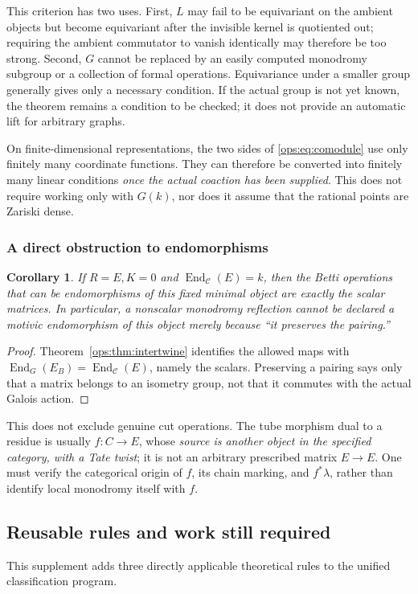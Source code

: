 \documentclass[11pt,a4paper,oneside]{article}
\theoremstyle{plain}
\newtheorem{corollary}[theorem]{Corollary}
\theoremstyle{definition}
\theoremstyle{remark}
\newcommand{\End}{\operatorname{End}}
\numberwithin{equation}{section}
\begin{document}
This criterion has two uses. First, $L$ may fail to be equivariant on the ambient objects but become equivariant after the invisible kernel is quotiented out;
requiring the ambient commutator to vanish identically may therefore be too strong. Second, $G$ cannot be replaced by an easily computed
monodromy subgroup or a collection of formal operations. Equivariance under a smaller group generally gives only a necessary condition.
If the actual group is not yet known, the theorem remains a condition to be checked; it does not provide an automatic lift for arbitrary graphs.

On finite-dimensional representations, the two sides of \eqref{ops:eq:comodule} use only finitely many coordinate functions.
They can therefore be converted into finitely many linear conditions \emph{once the actual coaction has been supplied}.
This does not require working only with $G(k)$, nor does it assume that the rational points are Zariski dense.

\subsubsection{A direct obstruction to endomorphisms}
\begin{corollary}\label{ops:cor:scalar}
If $R=E,K=0$ and $\End_{\mathcal C}(E)=k$,
then the Betti operations that can be endomorphisms of this fixed minimal object are exactly the scalar matrices.
In particular, a nonscalar monodromy reflection cannot be declared a motivic endomorphism of this object merely because ``it preserves the pairing.''
\end{corollary}
\begin{proof}
Theorem~\ref{ops:thm:intertwine} identifies the allowed maps with
$\End_G(E_B)=\End_{\mathcal C}(E)$, namely the scalars.
Preserving a pairing says only that a matrix belongs to an isometry group, not that it commutes with the actual Galois action.
\end{proof}

This does not exclude genuine cut operations. The tube morphism dual to a residue is usually
$f:C\to E$, whose \emph{source is another object in the specified category, with a Tate twist};
it is not an arbitrary prescribed matrix $E\to E$.
One must verify the categorical origin of $f$, its chain marking, and $f^*\lambda$, rather than identify local monodromy itself with $f$.


\subsection{Reusable rules and work still required}
This supplement adds three directly applicable theoretical rules to the unified classification program.
\end{document}
